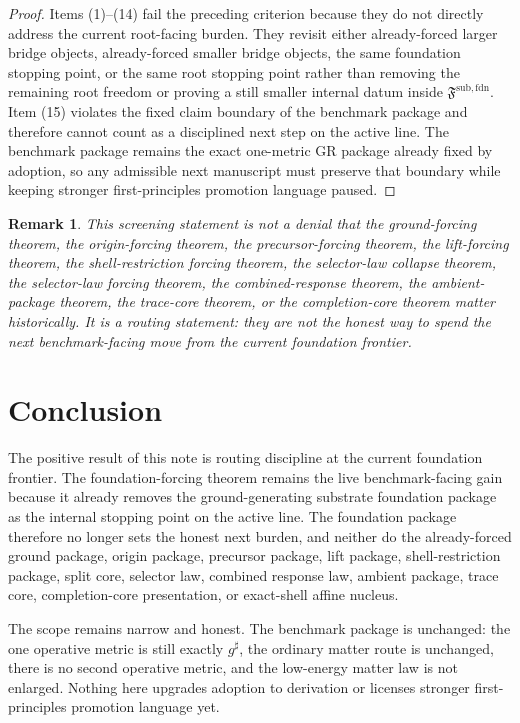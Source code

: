 \documentclass[11pt]{article}
\newcommand{\CompletedMetric}{g^{\sharp}}
\newcommand{\FoundationPackage}{\mathfrak F^{\mathrm{sub,fdn}}}
\newtheorem{remark}{Remark}
\begin{document}
\begin{proof}
Items (1)--(14) fail the preceding criterion because they do not directly address the current root-facing burden. They revisit either already-forced larger bridge objects, already-forced smaller bridge objects, the same foundation stopping point, or the same root stopping point rather than removing the remaining root freedom or proving a still smaller internal datum inside \(\FoundationPackage\). Item (15) violates the fixed claim boundary of the benchmark package and therefore cannot count as a disciplined next step on the active line. The benchmark package remains the exact one-metric GR package already fixed by adoption, so any admissible next manuscript must preserve that boundary while keeping stronger first-principles promotion language paused.
\end{proof}

\begin{remark}
This screening statement is not a denial that the ground-forcing theorem, the origin-forcing theorem, the precursor-forcing theorem, the lift-forcing theorem, the shell-restriction forcing theorem, the selector-law collapse theorem, the selector-law forcing theorem, the combined-response theorem, the ambient-package theorem, the trace-core theorem, or the completion-core theorem matter historically. It is a routing statement: they are not the honest way to spend the next benchmark-facing move from the current foundation frontier.
\end{remark}

\section{Conclusion}

The positive result of this note is routing discipline at the current foundation frontier. The foundation-forcing theorem remains the live benchmark-facing gain because it already removes the ground-generating substrate foundation package as the internal stopping point on the active line. The foundation package therefore no longer sets the honest next burden, and neither do the already-forced ground package, origin package, precursor package, lift package, shell-restriction package, split core, selector law, combined response law, ambient package, trace core, completion-core presentation, or exact-shell affine nucleus.

The scope remains narrow and honest. The benchmark package is unchanged: the one operative metric is still exactly \(\CompletedMetric\), the ordinary matter route is unchanged, there is no second operative metric, and the low-energy matter law is not enlarged. Nothing here upgrades adoption to derivation or licenses stronger first-principles promotion language yet.
\end{document}
